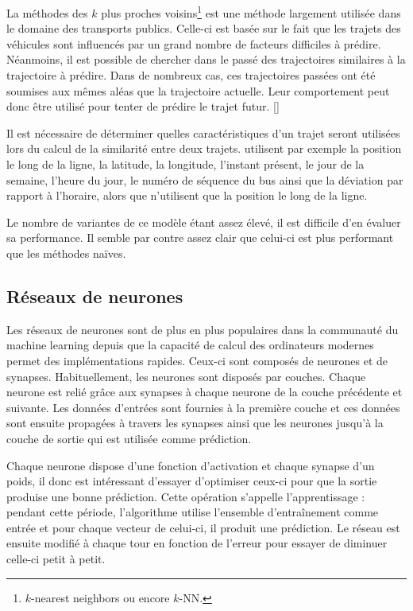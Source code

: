 \documentclass[letterpaper]{article}
\begin{document}
La méthodes des $k$ plus proches voisins\footnote{$k$-nearest neighbors ou encore $k$-NN.} est une méthode largement utilisée dans le domaine des transports publics. Celle-ci est basée sur le fait que les trajets des véhicules sont influencés par un grand nombre de facteurs difficiles à prédire. Néanmoins, il est possible de chercher dans le passé des trajectoires similaires à la trajectoire à prédire. Dans de nombreux cas, ces trajectoires passées ont été soumises aux mêmes aléas que la trajectoire actuelle. Leur comportement peut donc être utilisé pour tenter de prédire le trajet futur. [\cite{tiesyte2008similarity}]

Il est nécessaire de déterminer quelles caractéristiques d'un trajet seront utilisées lors du calcul de la similarité entre deux trajets. \cite{baker2014predicting} utilisent par exemple la position le long de la ligne, la latitude, la longitude, l'instant présent, le jour de la semaine, l'heure du jour, le numéro de séquence du bus ainsi que la déviation par rapport à l'horaire, alors que \cite{tiesyte2008similarity} n'utilisent que la position le long de la ligne.

Le nombre de variantes de ce modèle étant assez élevé, il est difficile d'en évaluer sa performance. Il semble par contre assez clair que celui-ci est plus performant que les méthodes naïves.

\subsection{Réseaux de neurones}

Les réseaux de neurones sont de plus en plus populaires dans la communauté du machine learning depuis que la capacité de calcul des ordinateurs modernes permet des implémentations rapides. Ceux-ci sont composés de neurones et de synapses. Habituellement, les neurones sont disposés par couches. Chaque neurone est relié grâce aux synapses à chaque neurone de la couche précédente et suivante. Les données d'entrées sont fournies à la première couche et ces données sont ensuite propagées à travers les synapses ainsi que les neurones jusqu'à la couche de sortie qui est utilisée comme prédiction.

Chaque neurone dispose d'une fonction d'activation et chaque synapse d'un poids, il donc est intéressant d'essayer d'optimiser ceux-ci pour que la sortie produise une bonne prédiction. Cette opération s'appelle l'apprentissage : pendant cette période, l'algorithme utilise l'ensemble d’entraînement comme entrée et pour chaque vecteur de celui-ci, il produit une prédiction. Le réseau est ensuite modifié à chaque tour en fonction de l'erreur pour essayer de diminuer celle-ci petit à petit.
\end{document}
